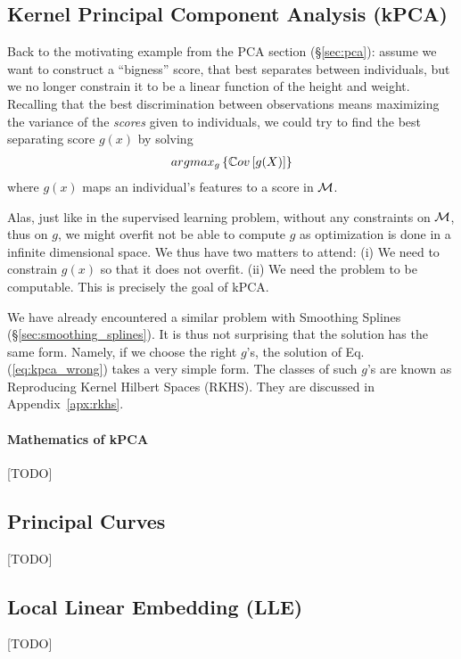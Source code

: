 \subsection{Kernel Principal Component Analysis (kPCA)}
\label{sec:kpca}

Back to the motivating example from the PCA section (\S\ref{sec:pca}): assume we want to construct a ``bigness'' score, that best separates between individuals, but we no longer constrain it to be a linear function of the height and weight.
Recalling that the best discrimination between observations means maximizing the variance of the \emph{scores} given to individuals, we could try to find the best separating score $g(x)$ by solving 
\begin{align}
\label{eq:kpca_wrong}
	argmax_{g}\left\{ \mathbb{C}ov \left[ g(X) \right] \right\}
\end{align}
where $g(x)$ maps an individual's features to a score in $\mathcal{M}$.

Alas, just like in the supervised learning problem, without any constraints on $\mathcal{M}$, thus on $g$, we might overfit \andor not be able to compute $g$ as optimization is done in a infinite dimensional space. 
We thus have two matters to attend:
(i) We need to constrain $g(x)$ so that it does not overfit.
(ii) We need the problem to be computable.
This is precisely the goal of kPCA. 

We have already encountered a similar problem with Smoothing Splines (\S\ref{sec:smoothing_splines}). It is thus not surprising that the solution has the same form. 
Namely, if we choose the right $g$'s, the solution of Eq.(\ref{eq:kpca_wrong}) takes a very simple form. 
The classes of such $g$'s are known as Reproducing Kernel Hilbert Spaces (RKHS). 
They are discussed in Appendix~\ref{apx:rkhs}.



\paragraph{Mathematics of kPCA}
[TODO]



\subsection{Principal Curves}
[TODO]



\subsection{Local Linear Embedding (LLE)}
[TODO]





